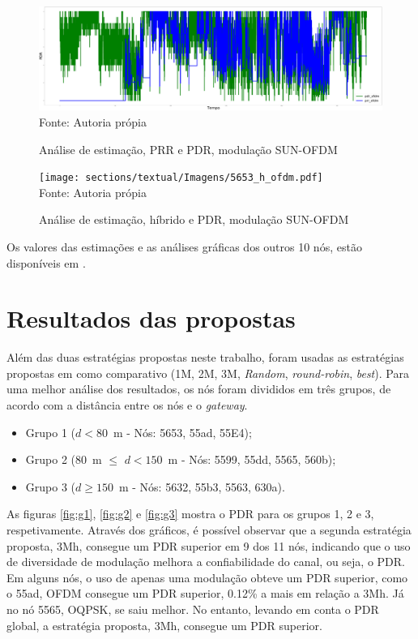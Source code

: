 \begin{figure}[H]
    \centering
    \caption{\footnotesize Análise de estimação, PRR e PDR, modulação SUN-OFDM}
    \includegraphics[scale = 0.08]{sections/textual/Imagens/5653_prr_ofdm.pdf}\\
    Fonte: Autoria própia
    \label{fig:graf8}
\end{figure}

\begin{figure}[H]
    \centering
    \caption{\footnotesize Análise de estimação, híbrido e PDR, modulação SUN-OFDM}
    \texttt{[image: sections/textual/Imagens/5653\_h\_ofdm.pdf]}\\
    Fonte: Autoria própia
    \label{fig:graf9}
\end{figure}

 Os valores das estimações e as análises gráficas dos outros 10 nós, estão disponíveis em \cite{GitDiego}. 


\section{Resultados das propostas}
\label{resultados}

Além das duas estratégias propostas neste trabalho, foram usadas as estratégias propostas em \cite{gomes2020improving} como comparativo (1M, 2M, 3M, \textit{Random}, \textit{round-robin}, \textit{best}). Para uma melhor análise dos resultados, os nós foram divididos em três grupos, de acordo com a distância entre os nós e o \textit{gateway}. 

\begin{itemize}
\item Grupo 1 ($d < 80$~m - Nós: 5653, 55ad, 55E4); 
\item Grupo 2 (80~m $\le$ $d < 150$~m - Nós: 5599, 55dd, 5565, 560b);
\item Grupo 3 ($d \ge 150$~m - Nós: 5632, 55b3, 5563, 630a).
\end{itemize}

As figuras \ref{fig:g1}, \ref{fig:g2} e \ref{fig:g3} mostra o PDR para os grupos 1, 2 e 3, respetivamente. Através dos gráficos, é possível observar que a segunda estratégia proposta, 3Mh, consegue um PDR superior em 9 dos 11 nós, indicando que o uso de diversidade de modulação melhora a confiabilidade do canal, ou seja, o PDR. Em alguns nós, o uso de apenas uma modulação obteve um PDR superior, como o 55ad, OFDM consegue um PDR superior, 0.12\% a mais em relação a 3Mh. Já no nó 5565, OQPSK,  se saiu melhor. No entanto, levando em conta o PDR global, a estratégia proposta, 3Mh, consegue um PDR superior. 

